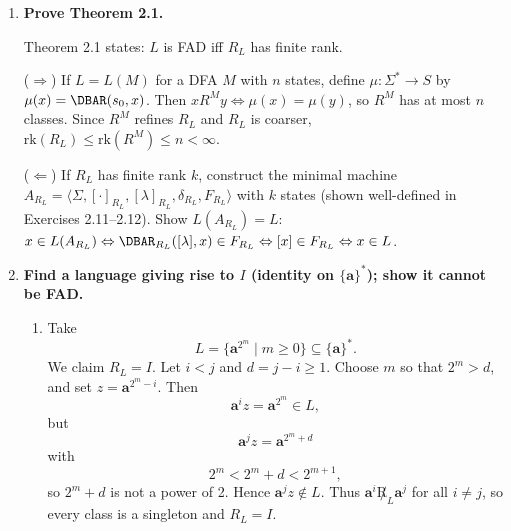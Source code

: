 \begin{enumerate}[{2.}1.]
\textit{Claim}: $(\forall i\in\NN)(\DBAR(s_0,uv^iw')=\DBAR(s_0,uvw')=f\in F)$.

\textit{Proof by induction on $i$}:

$i=0$: $\DBAR(s_0,uw')=\DBAR(\DBAR(s_0,u),w')=\DBAR(s,w')$. And $\DBAR(s_0,uvw')=\DBAR(\DBAR(s_0,uv),w')=\DBAR(s,w')$ (since $\DBAR(s,v)=s$). Equal. \checkmark

$i\to i+1$: By the inner induction, $\DBAR(s_0,uv^i)=s$ (base: $\DBAR(s_0,u)=s$; step: $\DBAR(s_0,uv^{i+1})=\DBAR(\DBAR(s_0,uv^i),v)=\DBAR(s,v)=s$). Therefore
\[
\DBAR(s_0,uv^{i+1}w')=\DBAR(\DBAR(s_0,uv^i),vw')=\DBAR(s,vw')=\DBAR(\DBAR(s,v),w')=\DBAR(s,w').
\]

So $\DBAR(s_0,uv^iw')=\DBAR(s,w')=f$ for all $i$. $\square$

\item \textbf{Prove Theorem 2.1.}

Theorem 2.1 states: $L$ is FAD iff $R_L$ has finite rank.

($\Rightarrow$) If $L=L(M)$ for a DFA $M$ with $n$ states, define $\mu: \Sigma^*\to S$ by $\mu(x)=\DBAR(s_0,x)$. Then $x R^M y\Leftrightarrow\mu(x)=\mu(y)$, so $R^M$ has at most $n$ classes. Since $R^M$ refines $R_L$ and $R_L$ is coarser, $\mathrm{rk}(R_L)\leq\mathrm{rk}(R^M)\leq n<\infty$.

($\Leftarrow$) If $R_L$ has finite rank $k$, construct the minimal machine $A_{R_L}=\langle\Sigma,[{\cdot}]_{R_L},[\lambda]_{R_L},\delta_{R_L},F_{R_L}\rangle$ with $k$ states (shown well-defined in Exercises 2.11--2.12). Show $L(A_{R_L})=L$: $x\in L(A_{R_L})\Leftrightarrow\DBAR_{R_L}([\lambda],x)\in F_{R_L}\Leftrightarrow[x]\in F_{R_L}\Leftrightarrow x\in L$.

\item \textbf{Find a language giving rise to $I$ (identity on $\{\mathbf{a}\}^*$); show it cannot be FAD.}

\begin{enumerate}
\item Take
\[
L=\{\mathbf a^{2^m}\mid m\ge0\}\subseteq\{\mathbf a\}^*.
\]
We claim $R_L=I$.
Let $i<j$ and $d=j-i\ge1$.
Choose $m$ so that $2^m>d$, and set $z=\mathbf a^{2^m-i}$.
Then
\[
\mathbf a^i z=\mathbf a^{2^m}\in L,
\]
but
\[
\mathbf a^j z=\mathbf a^{2^m+d}
\]
with
\[
2^m<2^m+d<2^{m+1},
\]
so $2^m+d$ is not a power of 2. Hence $\mathbf a^j z\notin L$.
Thus $\mathbf a^i\not R_L \mathbf a^j$ for all $i\ne j$, so every class is a singleton and $R_L=I$.


\end{enumerate}
\end{enumerate}
